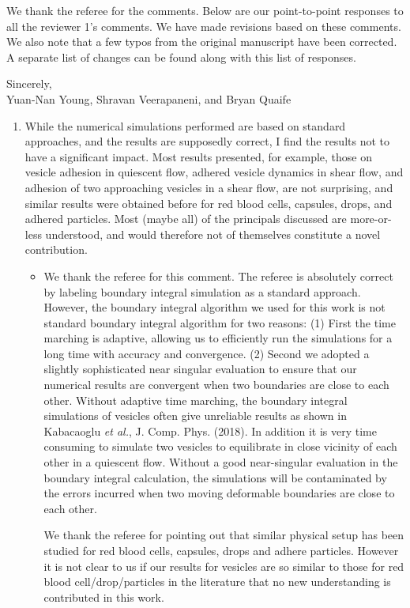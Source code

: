 \documentclass[11pt]{article}
\newcommand{\comment}[1]{{\color{blue} #1}}
\begin{document}
\noindent
We thank the referee for the comments.  Below are our point-to-point responses to 
all the reviewer 1's comments.  We have made revisions based on these comments.
We also note that a few typos from the original manuscript have
been corrected.  A separate list of changes can be found along with this list of responses.


\noindent 
Sincerely, \\ \noindent
Yuan-Nan Young, Shravan Veerapaneni, and Bryan Quaife

\vspace{20pt}
\noindent

\begin{enumerate}
\item\comment{While the numerical simulations performed are based on standard
approaches, and the results are supposedly correct, I find the results
not to have a significant impact. Most results presented, for example,
those on vesicle adhesion in quiescent flow, adhered vesicle dynamics in
shear flow, and adhesion of two approaching vesicles in a shear flow,
are not surprising, and similar results were obtained before for red
blood cells, capsules, drops, and adhered particles. Most (maybe all) of
the principals discussed are more-or-less understood, and would
therefore not of themselves constitute a novel contribution.}
\begin{itemize}
  \item We thank the referee for this comment. The referee is absolutely correct by labeling boundary integral simulation as a standard approach.
  However, the boundary integral algorithm we used for this work is not standard boundary integral algorithm for two reasons: (1) First the time marching is adaptive, allowing us to efficiently run the simulations for a long time with accuracy and convergence. (2) Second we adopted a slightly sophisticated near singular evaluation to ensure that our numerical results are convergent when two boundaries are close to each other. Without adaptive time marching, the boundary integral simulations of vesicles often give unreliable results as shown in
Kabacaoglu {\it et al.}, J. Comp. Phys. (2018). In addition it is very time consuming to simulate two vesicles to equilibrate in close vicinity of each other in a quiescent flow. 
Without a good near-singular evaluation in the boundary integral calculation, the simulations will be contaminated by the errors incurred when two moving deformable boundaries are close to each other.
  
  We thank the referee for pointing out that similar physical setup has been studied for red blood cells, capsules, drops and adhere particles. 
  However it is not clear to us if our results for vesicles are so similar to those for red blood cell/drop/particles in the literature that no new understanding is contributed in this work.
  

\end{itemize}
\end{enumerate}
\end{document}
